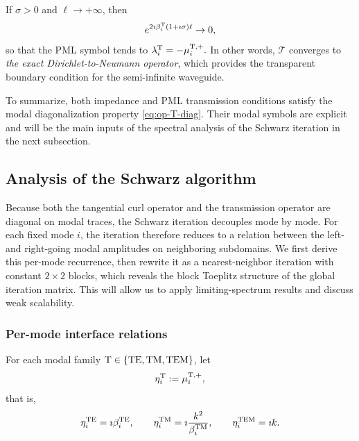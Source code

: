 \documentclass[smallextended]{svjour3}       %
\begin{document}
\begin{remark}
If $\sigma>0$ and $\ell\to+\infty$, then
\[
e^{2\imath \beta_i^{\rm T}(1+\imath\sigma)\ell}\to 0,
\]
so that the PML symbol tends to
\(
\lambda_i^{\rm T}=-\mu_i^{{\rm T},+}.
\)
In other words, $\mathcal T$ converges to \emph{the exact Dirichlet-to-Neumann operator}, which provides the transparent boundary condition for the semi-infinite waveguide.
\end{remark}

To summarize, both impedance and PML transmission conditions satisfy the modal diagonalization property \eqref{eq:op-T-diag}. Their modal symbols are explicit and will be the main inputs of the spectral analysis of the Schwarz iteration in the next subsection.


\subsection{Analysis of the Schwarz algorithm}

Because both the tangential curl operator and the transmission operator are diagonal on modal traces, the Schwarz iteration decouples mode by mode. For each fixed mode \(i\), the iteration therefore reduces to a relation between the left- and right-going modal amplitudes on neighboring subdomains. We first derive this per-mode recurrence, then rewrite it as a nearest-neighbor iteration with constant \(2\times 2\) blocks, which reveals the block Toeplitz structure of the global iteration matrix. This will allow us to apply limiting-spectrum results and discuss weak scalability.

\subsubsection{Per-mode interface relations}

For each modal family ${\rm T}\in\{{\rm TE,TM,TEM}\}$, let
\[
\eta_i^{\rm T}:=\mu_i^{{\rm T},+},
\]
that is,
\[
\eta_i^{\rm TE}=\imath\beta_i^{\rm TE},\qquad
\eta_i^{\rm TM}=\imath\frac{k^2}{\beta_i^{\rm TM}},\qquad
\eta_i^{\rm TEM}=\imath k.
\]
\end{document}
